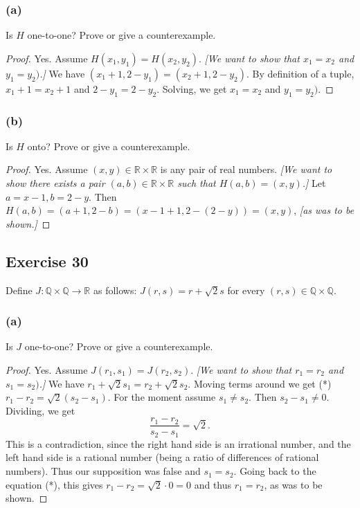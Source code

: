 \documentclass[14pt]{extarticle}
\newcommand{\R}{\mathbb{R}}
\newcommand{\Q}{\mathbb{Q}}
\begin{document}
\subsubsection{(a)}
Is $H$ one-to-one? Prove or give a counterexample.

\begin{proof}
Yes. Assume \(H(x_1, y_1) = H(x_2, y_2)\). {\it [We want to show that \(x_1 = x_2\) and \(y_1 = y_2)\).]}
We have \((x_1+1, 2-y_1) = (x_2+1, 2-y_2)\). By definition of a tuple, \(x_1+1 = x_2+1\) and \(2-y_1 = 2-y_2\).
Solving, we get \(x_1 = x_2\) and \(y_1 = y_2)\).
\end{proof}

\subsubsection{(b)}
Is $H$ onto? Prove or give a counterexample.

\begin{proof}
Yes. Assume \((x,y) \in \R \times \R\) is any pair of real numbers. {\it [We want to show there exists a pair
\((a, b) \in \R \times \R\) such that \(H(a,b) = (x,y)\).]} Let \(a = x-1, b = 2-y\). Then \(H(a, b) = (a+1, 2-b) = 
(x-1+1, 2-(2-y)) = (x,y)\), {\it [as was to be shown.]}
\end{proof}

\subsection{Exercise 30}
Define \(J: \Q \times \Q \to \R\) as follows: \(J(r, s) = r + \sqrt{2}s\) for every \((r, s) \in \Q \times \Q\).

\subsubsection{(a)}
Is $J$ one-to-one? Prove or give a counterexample.

\begin{proof}
Yes. Assume \(J(r_1, s_1) = J(r_2, s_2)\). {\it [We want to show that \(r_1 = r_2\) and \(s_1 = s_2)\).]}
We have \(r_1 + \sqrt{2}s_1 = r_2 + \sqrt{2}s_2\). Moving terms around we get (*) \(r_1-r_2=\sqrt{2}(s_2-s_1)\).
For the moment assume \(s_1 \neq s_2\). Then \(s_2 - s_1 \neq 0\). Dividing, we get
\[
\frac{r_1 - r_2}{s_2 - s_1} = \sqrt{2}.
\]
This is a contradiction, since the right hand side is an irrational number, and the left hand side is a rational
number (being a ratio of differences of rational numbers). Thus our supposition was false and \(s_1 = s_2\). Going
back to the equation (*), this gives \(r_1-r_2=\sqrt{2} \cdot 0 = 0\) and thus \(r_1 = r_2\), as was to be shown.
\end{proof}
\end{document}
